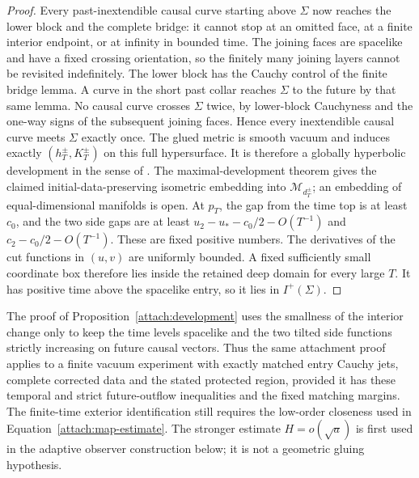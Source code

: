 \begin{proof}
Every past-inextendible causal curve starting above $\Sigma$ now
reaches the lower block and the complete bridge: it cannot stop at
an omitted face, at a finite interior endpoint, or at infinity in
bounded time. The joining faces are spacelike and have a fixed
crossing orientation, so the finitely many joining layers cannot
be revisited indefinitely. The lower block has the Cauchy control
of the finite bridge lemma. A curve in the short past collar reaches
$\Sigma$ to the future by that same lemma. No causal curve crosses
$\Sigma$ twice, by lower-block Cauchyness and the one-way signs of
the subsequent joining faces. Hence every inextendible causal curve
meets $\Sigma$ exactly once. The glued metric is smooth vacuum and
induces exactly $(h_T^\pm,K_T^\pm)$ on this full hypersurface.
It is therefore a globally hyperbolic development in the sense of
\cite[Definition~2.1]{Sbierski2016}. The maximal-development theorem
\cite[Definition~2.2 and Theorem~2.8]{Sbierski2016} gives the claimed
initial-data-preserving isometric embedding into
$\mathcal M_{d_T^\pm}$; an embedding of equal-dimensional manifolds
is open. At $p_T$, the gap from the time top is at least $c_0$, and the
two side gaps are at least $u_2-u_*-c_0/2-O(T^{-1})$ and
$c_2-c_0/2-O(T^{-1})$. These are fixed positive numbers.
The derivatives of the cut functions in $(u,v)$ are uniformly
bounded. A fixed sufficiently small coordinate box therefore lies
inside the retained deep domain for every large $T$. It has positive
time above the spacelike entry, so it lies in $I^+(\Sigma)$.
\end{proof}


\begin{remark}
\label{attach:geometric-contract}
The proof of Proposition~\ref{attach:development} uses the smallness
of the interior change only to keep the time levels spacelike and
the two tilted side functions strictly increasing on future causal
vectors. Thus the same attachment proof applies to a finite vacuum
experiment with exactly matched entry Cauchy jets, complete corrected
data and the stated protected region, provided it has these temporal
and strict future-outflow inequalities and the fixed matching margins.
The finite-time exterior identification still requires the low-order
closeness used in Equation~\eqref{attach:map-estimate}. The stronger
estimate $H=o(\sqrt a)$ is first used in the adaptive observer
construction below; it is not a geometric gluing hypothesis.
\end{remark}

